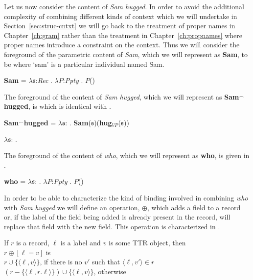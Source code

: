Let us now consider the content of \textit{Sam hugged}.  In order to
avoid the additional complexity of combining different kinds of
context which we will undertake in Section~\ref{sec:struc-cntxt} we
will go back to the treatment of proper names in Chapter~\ref{ch:gram}
rather than the treatment in Chapter~\ref{ch:propnames} where proper
names introduce a constraint on the context. Thus we will consider the
foreground of the parametric content of \textit{Sam}, which we will
represent as \textbf{Sam}, to be \nexteg{}
where `sam' is a particular individual named Sam.
\begin{ex} 
\textbf{Sam} = $\lambda\mathfrak{s}$:\textit{Rec} . $\lambda P$:\textit{Ppty} . $P$() 
\end{ex}
The foreground of the content of \textit{Sam hugged}, which we will
represent as \textbf{Sam$^\frown$hugged}, is  which is
identical with .
\begin{ex} 
\begin{subex} 
 
\item \textbf{Sam$^\frown$hugged} =
  $\lambda\mathfrak{s}$:
  . \textbf{Sam}($\mathfrak{s}$)(\textbf{hug}$_{\mathit{VP}}$($\mathfrak{s}$)) 
 
\item
  $\lambda\mathfrak{s}$:
  . 
 
\end{subex} 
   
\end{ex}
The foreground of the content of \textit{who}, which we will represent
as \textbf{who}, is given in \nexteg{}.
\begin{ex} 
\textbf{who} =
$\lambda\mathfrak{s}$:
. $\lambda P$:\textit{Ppty} . $P$() 
\end{ex} 
In order to be able to characterize the kind of binding involved in
combining \textit{who} with \textit{Sam hugged} we will define an
operation, $\oplus$, which adds a field to a record or, if the label
of the field being added
is already present in the record, will replace that field with the new
field.  This operation is characterized in \nexteg{}.
\begin{ex} 
If $r$ is a record, $\ell$ is a label and $v$ is some TTR object, then
\\
\hspace*{1em} $r\oplus[\ell=v]$ is \\
\hspace*{2em} $r\cup\{\langle\ell,v\rangle\}$, if there is no $v'$
such that $\langle\ell,v'\rangle\in r$\\
\hspace*{2em}
$(r-\{\langle\ell,r.\ell\rangle\})\cup\{\langle\ell,v\rangle\}$, otherwise 
\end{ex} 
